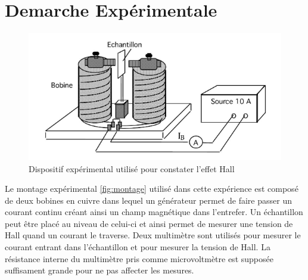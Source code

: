 \section{Demarche Expérimentale}


\begin{minipage}{\textwidth}
    \begin{figure}
        \centering
        \includegraphics[width=\linewidth]{figures/montage.png}
        \caption{Dispositif expérimental utilisé pour constater l'effet Hall \cite{notice}}
        \label{fig:montage}
    \end{figure}

    Le montage expérimental \autoref{fig:montage} utilisé dans cette expérience est composé de deux bobines en cuivre dans lequel un générateur permet de faire passer un courant continu créant ainsi un champ magnétique dans l'entrefer. Un échantillon peut être placé au niveau de celui-ci et ainsi permet de mesurer une tension de Hall quand un courant le traverse. Deux multimètre sont utilisés pour mesurer le courant entrant dans l'échantillon et pour mesurer la tension de Hall. La résistance interne du multimètre pris comme microvoltmètre est supposée suffisament grande pour ne pas affecter les mesures.
\end{minipage}


